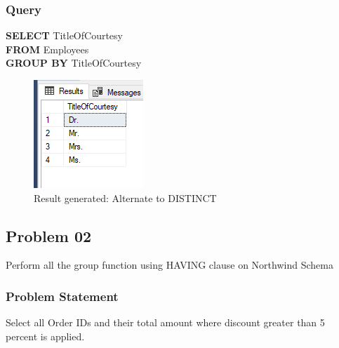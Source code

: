 \documentclass[12pt,a4paper]{report}
\begin{document}
\subsubsection{Query}
\begin{center}
	\begin{minipage}{12cm}
		\textbf{SELECT} TitleOfCourtesy\\
		\textbf{FROM} Employees\\
		\textbf{GROUP BY} TitleOfCourtesy
	\end{minipage}
	\begin{figure}[h]
	\centering
		\includegraphics[scale=1]{images/3.png}
		\caption{Result generated: Alternate to DISTINCT}
	\end{figure}
\end{center}

\subsection{Problem 02}
Perform all the group function using HAVING clause on Northwind Schema
\subsubsection{Problem Statement}
Select all Order IDs and their total amount where discount greater than 5 percent is applied.
\end{document}
